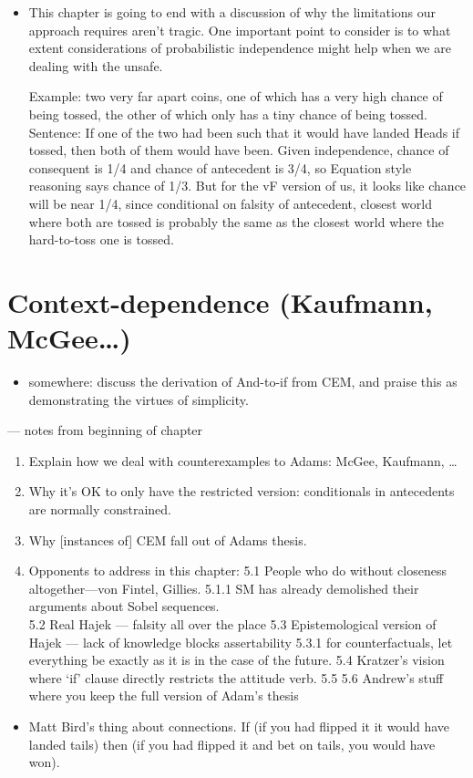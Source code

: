 \documentclass[If.tex]{subfiles}
\begin{document}
\begin{itemize}
	\item 
	This chapter is going to end with a discussion of why the limitations our approach requires aren't tragic.  One important point to consider is to what extent considerations of probabilistic independence might help when we are dealing with the unsafe.  
	
	Example: two very far apart coins, one of which has a very high chance of being tossed, the other of which only has a tiny chance of being tossed.  Sentence: If one of the two had been such that it would have landed Heads if tossed, then both of them would have been.  Given independence, chance of consequent is 1/4 and chance of antecedent is 3/4, so Equation style reasoning says chance of 1/3.  But for the vF version of us, it looks like chance will be near 1/4, since conditional on falsity of antecedent, closest world where both are tossed is probably the same as the closest world where the hard-to-toss one is tossed.  
\end{itemize}

\section{Context-dependence (Kaufmann,
McGee\ldots{})}\label{context-dependence-kaufmann-mcgee}

\begin{itemize}
\item
  somewhere: discuss the derivation of And-to-if from CEM, and praise
  this as demonstrating the virtues of simplicity.
\end{itemize}

--- notes from beginning of chapter

\begin{enumerate}
\item
Explain how we deal with counterexamples to Adams: McGee, Kaufmann, \ldots{}
\item
Why it's OK to only have the restricted version: conditionals in
antecedents are normally constrained.
\item
Why {[}instances of{]} CEM fall out of Adams thesis.\\
\item
Opponents to address in this chapter: 5.1 People who do without
closeness altogether---von Fintel, Gillies. 5.1.1 SM has already
demolished their arguments about Sobel sequences.\\
5.2 Real Hajek --- falsity all over the place 5.3 Epistemological
version of Hajek --- lack of knowledge blocks assertability 5.3.1 for
counterfactuals, let everything be exactly as it is in the case of the
future. 5.4 Kratzer's vision where ‘if’ clause directly restricts the
attitude verb. 5.5 5.6 Andrew's stuff where you keep the full version
of Adam's thesis
\end{enumerate}

\begin{itemize}
\item
  Matt Bird's thing about connections. If (if you had flipped it it
  would have landed tails) then (if you had flipped it and bet on tails,
  you would have won).
\end{itemize}
\end{document}
